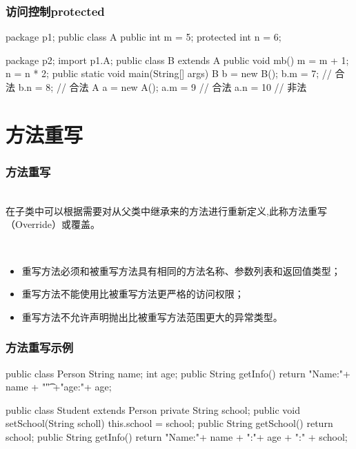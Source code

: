 \begin{frame}[fragile] %
\frametitle{访问控制protected}

\begin{javaCode}
package p1;
public class A {
  public int m = 5;
  protected int n = 6;
}
\end{javaCode}

\begin{javaCode}
package p2;
import p1.A;
public class B extends A{
  public void mb() {
    m = m + 1;
    n = n * 2;
  }
  public static void main(String[] args) {
    B b = new B();
    b.m = 7;  // 合法
    b.n = 8;   // 合法
    A a = new A();
    a.m = 9 // 合法
    a.n = 10 // 非法
  }
}
\end{javaCode}
\end{frame}

\section{方法重写}
\begin{frame}[fragile] %
\frametitle{方法重写}

\\
在子类中可以根据需要对从父类中继承来的方法进行重新定义,此称方法重写（Override）或覆盖。

\\
\begin{itemize}
\item 重写方法必须和被重写方法具有相同的方法名称、参数列表和返回值类型；
\item 重写方法不能使用比被重写方法更严格的访问权限；
\item 重写方法不允许声明抛出比被重写方法范围更大的异常类型。
\end{itemize}
\end{frame}

\begin{frame}[fragile] %
\frametitle{方法重写示例}
\begin{javaCode}
public class Person {
  String name;
  int age;
  public String getInfo() {
    return "Name:"+ name + "\t" +"age:"+ age;
  }
}
\end{javaCode}

\begin{javaCode}
public class Student extends Person {
  private String school;
  public void setSchool(String scholl) {
    this.school = school;
  }
  public String getSchool(){
    return school;
  }
  public String getInfo() {
    return "Name:"+ name + "\tAge:"+ age + "\tSchool:" + school;
  }
}
\end{javaCode}
\end{frame}


